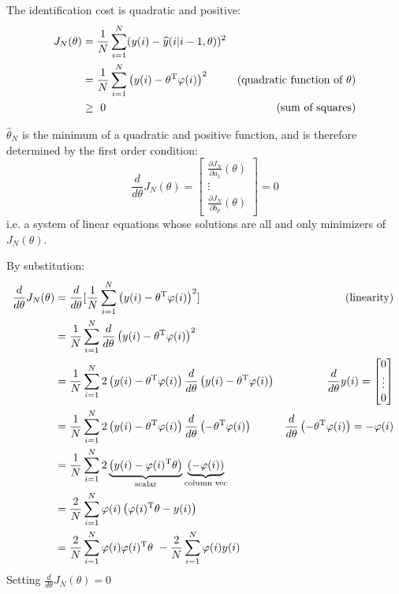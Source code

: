 The identification cost is quadratic and positive:		
\begin{align*}
J_{N}(\theta) & =\frac{1}{N}\sum _{i=1}^{N}(y(i) -\widehat{y}(i|i-1,\theta))^{2} & \\
 & =\frac{1}{N}\sum _{i=1}^{N}\left(y(i) -\theta ^{\mathrm{T}} \varphi (i)\right)^{2} & (\text{quadratic function of} \ \theta) \\
 & \geq \ 0 & \text{(sum of squares)}
\end{align*}


$ \hat{\theta }_{N}$ is the minimum of a quadratic and positive function, and is therefore determined by the first order condition:
\begin{equation*}
\frac{d}{d\theta } J_{N}(\theta) =\begin{bmatrix}
\frac{\partial J_{N}}{\partial a_{1}}(\theta)\\
\vdots \\
\frac{\partial J_{N}}{\partial b_{p}}(\theta)
\end{bmatrix} =0
\end{equation*}
i.e. a system of linear equations whose solutions are all and only minimizers of $ J_{N}(\theta)$.

By substitution:
\begin{equation*}
\begin{aligned}
\frac{d}{d\theta } J_{N}(\theta) & =\frac{d}{d\theta }[\frac{1}{N}\sum _{i=1}^{N}\left(y(i) -\theta ^{\mathrm{T}} \varphi (i)\right)^{2}] & \text{(linearity)}\\
 & =\frac{1}{N}\sum _{i=1}^{N}\frac{d}{d\theta }\left(y(i) -\theta ^{\mathrm{T}} \varphi (i)\right)^{2} & \\
 & =\frac{1}{N}\sum _{i=1}^{N} 2\left(y(i) -\theta ^{\mathrm{T}} \varphi (i)\right)\frac{d}{d\theta }\left(y(i) -\theta ^{\mathrm{T}} \varphi (i)\right) & \frac{d}{d\theta } y(i) =\begin{bmatrix}
0\\
\vdots \\
0
\end{bmatrix}\\
 & =\frac{1}{N}\sum _{i=1}^{N} 2\left(y(i) -\theta ^{\mathrm{T}} \varphi (i)\right)\frac{d}{d\theta }\left(-\theta ^{\mathrm{T}} \varphi (i)\right) & \frac{d}{d\theta }\left(-\theta ^{\mathrm{T}} \varphi (i)\right) =-\varphi (i)\\
 & =\frac{1}{N}\sum _{i=1}^{N} 2\underbrace{\left(y(i) -\varphi (i)^{\mathrm{T}} \theta \right)}_{\text{scalar}}\underbrace{(-\varphi (i))}_{\text{column vec}} & \\
 & =\frac{2}{N}\sum _{i=1}^{N} \varphi (i)\left(\varphi (i)^{\mathrm{T}} \theta -y(i)\right) & \\
 & =\frac{2}{N}\sum _{i=1}^{N} \varphi (i) \varphi (i)^{\mathrm{T}} \theta \ -\frac{2}{N}\sum _{i=1}^{N} \varphi (i) y(i) & 
\end{aligned} \ 
\end{equation*}
Setting $ \frac{d}{d\theta } J_{N}(\theta) =0$	


